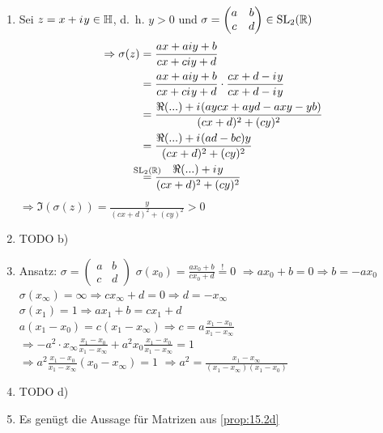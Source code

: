 \begin{beweis}\leavevmode
    \begin{enumerate}[label=\alph*)]
        \item Sei $z = x + {i\mkern1mu} y \in \mathbb{H}$, d.~h. $y>0$ und
              $\sigma=\begin{pmatrix}a&b\\c&d\end{pmatrix} \in \mathrm{SL}_2(\mathbb{R})$
              \begin{align}
                \Rightarrow \sigma(z) &= \frac{ax + aiy + b}{cx + ciy +d}\\
                &= \frac{ax + aiy + b}{cx + c \iu y +d} \cdot \frac{cx+d-\iu y}{cx+d-\iu y}\\
                &= \frac{\Re(...) + \iu (aycx + ayd - axy - yb)}{(cx+d)^2 + (cy)^2}\\
                &= \frac{\Re(...) + \iu (ad-bc)y}{(cx+d)^2 + (cy)^2}\\
                &\overset{\mathclap{\SL_2(\mdr)}}{=} \frac{\Re(...) + \iu y}{(cx+d)^2 + (cy)^2}
              \end{align}
                $\Rightarrow \Im(\sigma(z)) = \frac{y}{(cx+d)^2 + (cy)^2} > 0$
        \item TODO b)
        \item Ansatz: $\sigma = \begin{pmatrix}a & b\\c & d\end{pmatrix}$
              $\sigma(x_0) = \frac{ax_0 + b}{c x_0 + d} \overset{!}{=} 0$
              $\Rightarrow a x_0 + b = 0 \Rightarrow b = -a x_0$\\
              $\sigma(x_\infty) = \infty \Rightarrow c x_\infty + d = 0 \Rightarrow d = - x_\infty$\\
              $\sigma(x_1) = 1 \Rightarrow a x_1 + b = c x_1 + d$\\
              $a (x_1 - x_0) = c (x_1 - x_\infty) \Rightarrow c = a \frac{x_1 - x_0}{x_1 - x_\infty}$\\
              $\Rightarrow - a^2 \cdot x_\infty \frac{x_1 - x_0}{x_1 - x_\infty} + a^2 x_0 \frac{x_1 - x_0}{x_1 - x_\infty} = 1$\\
              $\Rightarrow a^2 \frac{x_1 - x_0}{x_1 - x_\infty} (x_0 - x_\infty) = 1$
              $\Rightarrow a^2 = \frac{x_1 - x_\infty}{(x_1 - x_\infty) (x_1 - x_0)}$
        \item TODO d)
        \item Es genügt die Aussage für Matrizen aus \cref{prop:15.2d}

\end{enumerate}
\end{beweis}
